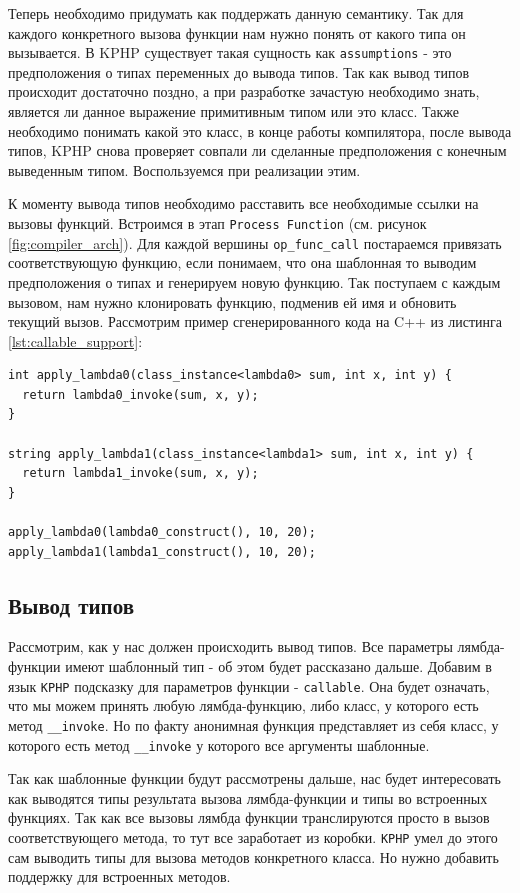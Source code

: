 Теперь необходимо придумать как поддержать данную семантику.
Так для каждого конкретного вызова функции нам нужно понять от какого типа он вызывается.
В KPHP существует такая сущность как \verb|assumptions| - это предположения о типах переменных до вывода типов.
Так как вывод типов происходит достаточно поздно, а при разработке зачастую необходимо знать, является ли данное выражение примитивным типом или это класс.
Также необходимо понимать какой это класс, в конце работы компилятора, после вывода типов, KPHP снова проверяет совпали ли сделанные предположения с конечным выведенным типом.
Воспользуемся при реализации этим.

К моменту вывода типов необходимо расставить все необходимые ссылки на вызовы функций.
Встроимся в этап \verb|Process Function| (см. рисунок \ref{fig:compiler_arch}).
Для каждой вершины \verb|op_func_call| постараемся привязать соответствующую функцию, если понимаем, что она шаблонная то выводим предположения о типах и генерируем новую функцию.
Так поступаем с каждым вызовом, нам нужно клонировать функцию, подменив ей имя и обновить текущий вызов.
Рассмотрим пример сгенерированного кода на C++ из листинга \ref{lst:callable_support}:
\begin{lstlisting}
int apply_lambda0(class_instance<lambda0> sum, int x, int y) {
  return lambda0_invoke(sum, x, y);
}

string apply_lambda1(class_instance<lambda1> sum, int x, int y) {
  return lambda1_invoke(sum, x, y);
}

apply_lambda0(lambda0_construct(), 10, 20);
apply_lambda1(lambda1_construct(), 10, 20);
\end{lstlisting}

\subsection{Вывод типов}
Рассмотрим, как у нас должен происходить вывод типов.
Все параметры лямбда-функции имеют шаблонный тип - об этом будет рассказано дальше.
Добавим в язык \verb|KPHP| подсказку для параметров функции - \verb|callable|.
Она будет означать, что мы можем принять любую лямбда-функцию, либо класс, у которого есть метод \verb|__invoke|.
Но по факту анонимная функция представляет из себя класс, у которого есть метод \verb|__invoke| у которого все аргументы шаблонные.

Так как шаблонные функции будут рассмотрены дальше, нас будет интересовать как выводятся типы результата вызова лямбда-функции и типы во встроенных функциях.
Так как все вызовы лямбда функции транслируются просто в вызов соответствующего метода, то тут все заработает из коробки.
\verb|KPHP| умел до этого сам выводить типы для вызова методов конкретного класса.
Но нужно добавить поддержку для встроенных методов.

